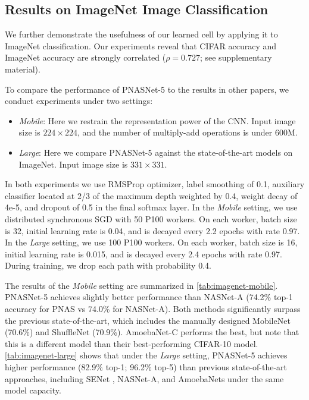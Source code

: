 \documentclass[runningheads]{llncs}
\begin{document}
\subsection{Results on ImageNet Image Classification}\label{sec:imagenet}

We further demonstrate the usefulness of our learned cell by applying it to ImageNet classification.
Our experiments reveal that CIFAR accuracy and ImageNet accuracy are strongly correlated ($\rho=0.727$; see supplementary material).

To compare the performance of PNASNet-5 
to the results in other papers,
we conduct experiments under two settings:
\begin{itemize}
    \item \textit{Mobile}: Here we restrain the representation power of the CNN.
    Input image size is $224 \times 224$, and the number of multiply-add operations is under 600M.
    \item \textit{Large}: Here we compare PNASNet-5 against the state-of-the-art models on ImageNet.
    Input image size is $331 \times 331$.
\end{itemize}In both experiments we use RMSProp optimizer, label smoothing of 0.1, auxiliary classifier located at 2/3 of the maximum depth weighted by 0.4, weight decay of 4e-5,
and dropout of 0.5 in the final softmax layer.
In the \textit{Mobile} setting, we use distributed synchronous SGD with 50 P100 workers.
On each worker, batch size is 32, initial learning rate is 0.04, and is decayed every 2.2 epochs with rate 0.97.
In the \textit{Large} setting, we use 100 P100 workers.
On each worker, batch size is 16, initial learning rate is 0.015, and is decayed every 2.4 epochs with rate 0.97.
During training, we drop each path with probability 0.4.



The results of the \textit{Mobile} setting are summarized in \cref{tab:imagenet-mobile}.
PNASNet-5 achieves slightly better performance than NASNet-A (74.2\% top-1 accuracy for PNAS vs 74.0\% for NASNet-A).
Both methods significantly surpass
the previous state-of-the-art,
which includes the manually
designed MobileNet \cite{DBLP:journals/corr/HowardZCKWWAA17} (70.6\%)
and ShuffleNet \cite{DBLP:journals/corr/ZhangZLS17} (70.9\%).
AmoebaNet-C performs the best, but note that this is a different model than their best-performing CIFAR-10 model.
\cref{tab:imagenet-large} shows that under the \textit{Large} setting, PNASNet-5 achieves higher performance (82.9\% top-1; 96.2\% top-5) than previous state-of-the-art approaches,
including SENet \cite{DBLP:journals/corr/abs-1709-01507}, NASNet-A, and AmoebaNets under the same model capacity.
\end{document}
